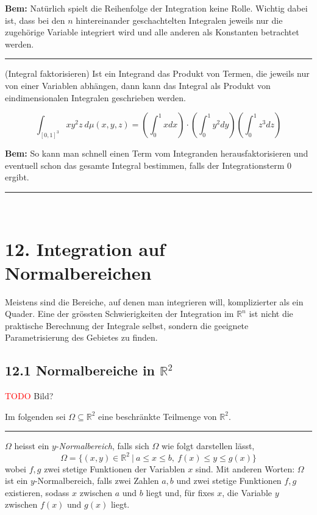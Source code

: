\documentclass[a4paper,landscape,8pt]{extarticle}
\newcommand{\R}{\mathbb{R}}
\newcommand{\setsep}{\ \vert \ }
\newcommand{\todo}{\textcolor{red}{TODO }}
\newcommand{\sep}{\vspace{5pt}\noindent\hrule\vspace{5pt}}
\newcommand{\Bem}{\textbf{Bem: }}
\renewcommand*{\newpage}{ \ }
\begin{document}
\begin{multicols*}{4}
\Bem Natürlich spielt die Reihenfolge der Integration keine Rolle. Wichtig dabei
ist, dass bei den $n$ hintereinander geschachtelten Integralen jeweils nur die
zugehörige Variable integriert wird und alle anderen als Konstanten betrachtet
werden.

\sep

\Trick (Integral faktorisieren) Ist ein Integrand das Produkt von Termen, die
jeweils nur von einer Variablen abhängen, dann kann das Integral als Produkt von
eindimensionalen Integralen geschrieben werden.

\Bsp
\[
\int_{[0,1]^3}xy^2z \ d\mu(x,y,z) = \left(\int_0^1x dx\right) \cdot
\left(\int_0^1y^2 dy\right) \left(\int_0^1z^3 dz\right)
\]

\Bem So kann man schnell einen Term vom Integranden herausfaktorisieren und
eventuell schon das gesamte Integral bestimmen, falls der Integrationsterm 0
ergibt.

\sep

\newpage

\section{12. Integration auf Normalbereichen}

Meistens sind die Bereiche, auf denen man integrieren will, komplizierter als
ein Quader. Eine der grössten Schwierigkeiten der Integration im $\R^n$ ist
nicht die praktische Berechnung der Integrale selbst, sondern die geeignete
Parametrisierung des Gebietes zu finden.

\subsection{12.1 Normalbereiche in $\R^2$}

\begin{warmup}
\todo Bild?
\end{warmup}

Im folgenden sei $\Omega\subseteq\R^2$ eine beschränkte Teilmenge von $\R^2$.

\sep

\Def $\Omega$ heisst ein $y$-\emph{Normalbereich}, falls sich $\Omega$ wie folgt
darstellen lässt,
\[
\Omega = \{(x,y)\in\R^2 \setsep a\leq x\leq b, \ f(x)\leq y \leq g(x)\}
\]
wobei $f,g$ zwei stetige Funktionen der Variablen $x$ sind. Mit anderen Worten:
$\Omega$ ist ein $y$-Normalbereich, falls zwei Zahlen $a,b$ und zwei stetige
Funktionen $f,g$ existieren, sodass $x$ zwischen $a$ und $b$ liegt und, für 
fixes $x$, die Variable $y$ zwischen $f(x)$ und $g(x)$ liegt.


\end{multicols*}
\end{document}
